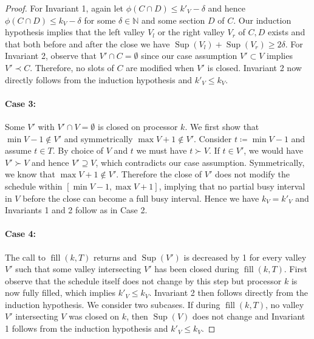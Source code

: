 \documentclass[a4paper]{article}
\DeclareMathOperator{\fillop}{fill}
\DeclareMathOperator{\res}{Sup}
\begin{document}
\begin{proof}
      For Invariant 1, again let $\phi(C \cap D) \leq k'_V - \delta$ and hence $\phi(C \cap D) \leq k_V - \delta$ for some $\delta \in \mathbb{N}$ and some section $D$ of $C$.
      Our induction hypothesis implies that the left valley $V_l$ or the right valley $V_r$ of $C, D$ exists and that both before and after the close we have $\res(V_l) + \res(V_r) \geq 2 \delta$.
      For Invariant 2, observe that $V' \cap C = \emptyset$ since our case assumption $V' \subset V$ implies $V' \prec C$.
      Therefore, no slots of $C$ are modified when $V'$ is closed.
      Invariant 2 now directly follows from the induction hypothesis and $k'_V \leq k_V$.


  \paragraph{Case 3:}
      Some $V'$ with $V' \cap V = \emptyset$ is closed on processor $k$.
      We first show that $\min V - 1 \notin V'$ and symmetrically $\max V + 1 \notin V'$.
      Consider $t \coloneqq \min V - 1$ and assume $t \in T$.
      By choice of $V$ and $t$ we must have $t \succ V$.
      If $t \in V'$, we would have $V' \succ V$ and hence $V' \supseteq V$, which contradicts our case assumption.
      Symmetrically, we know that $\max V + 1 \notin V'$.
      Therefore the close of $V'$ does not modify the schedule within $[\min V - 1, \max V + 1]$, implying that no partial busy interval in $V$ before the close can become a full busy interval.
      Hence we have $k_V = k'_V$ and Invariants 1 and 2 follow as in Case 2.

  \paragraph{Case 4:}
      The call to $\fillop(k, T)$ returns and $\res(V')$ is decreased by 1 for every valley $V'$ such that some valley intersecting $V'$ has been closed during $\fillop(k, T)$.
      First observe that the schedule itself does not change by this step but processor $k$ is now fully filled, which implies $k'_V \leq k_V$.
      Invariant 2 then follows directly from the induction hypothesis.
      We consider two subcases.
      If during $\fillop(k, T)$, no valley $V'$ intersecting $V$ was closed on $k$, then $\res(V)$ does not change and Invariant 1 follows from the induction hypothesis and $k'_V \leq k_V$.


\end{proof}
\end{document}
